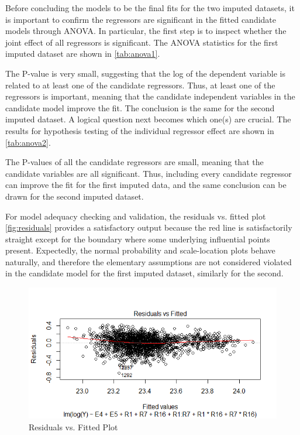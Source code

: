 \documentclass[11pt]{article}
\begin{document}
Before concluding the models to be the final fits for the two imputed datasets, it is important to confirm the regressors are significant in the fitted candidate models through ANOVA. In particular, the first step is to inspect whether the joint effect of all regressors is significant. The ANOVA statistics for the first imputed dataset are shown in \autoref{tab:anova1}.



The P-value is very small, suggesting that the log of the dependent variable is related to at least one of the candidate regressors. Thus, at least one of the regressors is important, meaning that the candidate independent variables in the candidate model improve the fit. The conclusion is the same for the second imputed dataset. A logical question next becomes which one(s) are crucial. The results for hypothesis testing of the individual regressor effect are shown in \autoref{tab:anova2}.



The P-values of all the candidate regressors are small, meaning that the candidate variables are all significant. Thus, including every candidate regressor can improve the fit for the first imputed data, and the same conclusion can be drawn for the second imputed dataset.

For model adequacy checking and validation, the residuals vs. fitted plot \autoref{fig:residuals} provides a satisfactory output because the red line is satisfactorily straight except for the boundary where some underlying influential points present. Expectedly, the normal probability and scale-location plots behave naturally, and therefore the elementary assumptions are not considered violated in the candidate model for the first imputed dataset, similarly for the second.

\begin{figure}[h!]
\begin{center}
\includegraphics[scale=0.69]{residuals}
\end{center}
\caption{Residuals vs. Fitted Plot}
\label{fig:residuals}
\end{figure}
\end{document}
